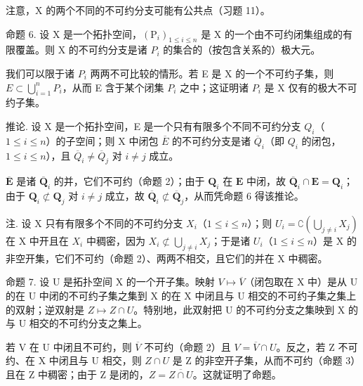 注意，X 的两个不同的不可约分支可能有公共点（习题 11）。

命题 6. 设 X 是一个拓扑空间，\((\mathrm{P}_{i})_{1\leq i\leq n}\) 是 X 的一个由不可约闭集组成的有限覆盖。则 X 的不可约分支是诸 \(P_{i}\) 的集合的（按包含关系的）极大元。

我们可以限于诸 \(P_{i}\) 两两不可比较的情形。若 E 是 X 的一个不可约子集，则 \(E \subset \bigcup_{i=1}^{n} P_{i}\)，从而 E 含于某个闭集 \(P_{i}\) 之中；这证明诸 \(P_{i}\) 是 X 仅有的极大不可约子集。

推论. 设 X 是一个拓扑空间，E 是一个只有有限多个不同不可约分支 \(Q_{i}\)（\(1 \leqslant i \leqslant n\)）的子空间；则 X 中闭包 \(\overline{E}\) 的不可约分支是诸 \(\overline{Q}_{i}\)（即 \(Q_{i}\) 的闭包，\(1 \leqslant i \leqslant n\)），且 \(\overline{Q}_{i} \neq \overline{Q}_{j}\) 对 \(i \neq j\) 成立。

\(\overline{\mathbf{E}}\) 是诸 \(\overline{\mathbf{Q}}_i\) 的并，它们不可约（命题 2）；由于 \(\mathbf{Q}_i\) 在 \(\mathbf{E}\) 中闭，故 \(\overline{\mathbf{Q}}_i \cap \mathbf{E} = \mathbf{Q}_i\)；由于 \(\mathbf{Q}_i \not\subset \mathbf{Q}_j\) 对 \(i \neq j\) 成立，故 \(\overline{\mathbf{Q}}_i \not\subset \overline{\mathbf{Q}}_j\)，从而凭命题 6 得该推论。

注. 设 X 只有有限多个不同的不可约分支 \(X_{i}\)（\(1 \leqslant i \leqslant n\)）；则 \(U_{i} = \complement\left(\bigcup_{j \neq i} X_{j}\right)\) 在 X 中开且在 \(X_{i}\) 中稠密，因为 \(X_{i} \not\subset \bigcup_{j \neq i} X_{j}\)；于是诸 \(U_{i}\)（\(1 \leqslant i \leqslant n\)）是 X 的非空开集，它们不可约（命题 2）、两两不相交，且它们的并在 X 中稠密。

命题 7. 设 U 是拓扑空间 X 的一个开子集。映射 \(V \mapsto \overline{V}\)（闭包取在 X 中）是从 U 的在 U 中闭的不可约子集之集到 X 的在 X 中闭且与 U 相交的不可约子集之集上的双射；逆双射是 \(Z \mapsto Z \cap U\)。特别地，此双射把 U 的不可约分支之集映到 X 的与 U 相交的不可约分支之集上。

若 V 在 U 中闭且不可约，则 \(\overline{V}\) 不可约（命题 2）且 \(V = \overline{V} \cap U\)。反之，若 Z 不可约、在 X 中闭且与 U 相交，则 \(Z \cap U\) 是 Z 的非空开子集，从而不可约（命题 3）且在 Z 中稠密；由于 Z 是闭的，\(Z = \overline{Z \cap U}\)。这就证明了命题。

